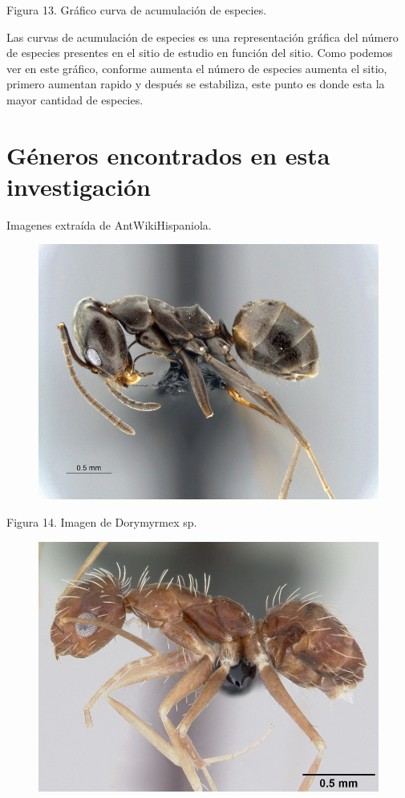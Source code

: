 \documentclass[11pt,]{article}
\begin{document}
Figura 13. Gráfico curva de acumulación de especies.

Las curvas de acumulación de especies es una representación gráfica del
número de especies presentes en el sitio de estudio en función del
sitio. Como podemos ver en este gráfico, conforme aumenta el número de
especies aumenta el sitio, primero aumentan rapido y después se
estabiliza, este punto es donde esta la mayor cantidad de especies.

\section{Géneros encontrados en esta
investigación}\label{guxe9neros-encontrados-en-esta-investigaciuxf3n}

Imagenes extraída de AntWikiHispaniola.

\begin{figure}
\centering
\includegraphics{dorymyrmex.jpg}
\caption{}
\end{figure}

Figura 14. Imagen de Dorymyrmex sp.

\begin{figure}
\centering
\includegraphics{paratrechina.jpg}
\caption{}
\end{figure}
\end{document}

